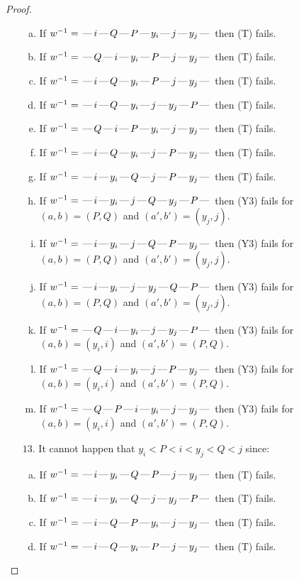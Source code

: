 \documentclass[10pt]{article}
\theoremstyle{definition}
\theoremstyle{definition}
\def\dash{\text{\hspace{0.5mm}---\hspace{0.5mm}}}
\begin{document}
\begin{proof}
\begin{enumerate}
\begin{enumerate}[(a)]
\item If $w^{-1} = \dash i\dash Q\dash P\dash y_i\dash j\dash y_j\dash $ then (T) fails.
\item If $w^{-1} = \dash Q\dash i\dash y_i\dash P\dash j\dash y_j\dash $ then (T) fails.
\item If $w^{-1} = \dash i\dash Q\dash y_i\dash P\dash j\dash y_j\dash $ then (T) fails.
\item If $w^{-1} = \dash i\dash Q\dash y_i\dash j\dash y_j\dash P\dash $ then (T) fails.
\item If $w^{-1} = \dash Q\dash i\dash P\dash y_i\dash j\dash y_j\dash $ then (T) fails.
\item If $w^{-1} = \dash i\dash Q\dash y_i\dash j\dash P\dash y_j\dash $ then (T) fails.
\item If $w^{-1} = \dash i\dash y_i\dash Q\dash j\dash P\dash y_j\dash $ then (T) fails.
\item If $w^{-1} = \dash i\dash y_i\dash j\dash Q\dash y_j\dash P\dash $ then (Y3) fails for $(a,b)=(P,Q)$ and $(a',b')=(y_j,j)$.
\item If $w^{-1} = \dash i\dash y_i\dash j\dash Q\dash P\dash y_j\dash $ then (Y3) fails for $(a,b)=(P,Q)$ and $(a',b')=(y_j,j)$.
\item If $w^{-1} = \dash i\dash y_i\dash j\dash y_j\dash Q\dash P\dash $ then (Y3) fails for $(a,b)=(P,Q)$ and $(a',b')=(y_j,j)$.
\item If $w^{-1} = \dash Q\dash i\dash y_i\dash j\dash y_j\dash P\dash $ then (Y3) fails for $(a,b)=(y_i,i)$ and $(a',b')=(P,Q)$.
\item If $w^{-1} = \dash Q\dash i\dash y_i\dash j\dash P\dash y_j\dash $ then (Y3) fails for $(a,b)=(y_i,i)$ and $(a',b')=(P,Q)$.
\item If $w^{-1} = \dash Q\dash P\dash i\dash y_i\dash j\dash y_j\dash $ then (Y3) fails for $(a,b)=(y_i,i)$ and $(a',b')=(P,Q)$.
\end{enumerate}
\item[$13$.] It cannot happen that $y_i < P < i < y_j < Q < j$ since:
\begin{enumerate}[(a)]
\item If $w^{-1} = \dash i\dash y_i\dash Q\dash P\dash j\dash y_j\dash $ then (T) fails.
\item If $w^{-1} = \dash i\dash y_i\dash Q\dash j\dash y_j\dash P\dash $ then (T) fails.
\item If $w^{-1} = \dash i\dash Q\dash P\dash y_i\dash j\dash y_j\dash $ then (T) fails.
\item If $w^{-1} = \dash i\dash Q\dash y_i\dash P\dash j\dash y_j\dash $ then (T) fails.

\end{enumerate}
\end{enumerate}
\end{proof}
\end{document}
